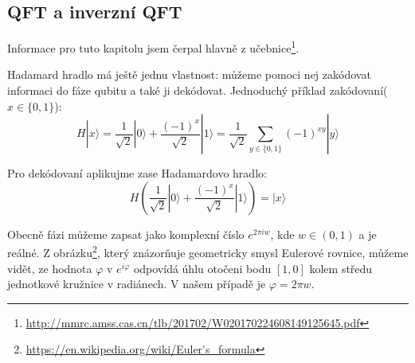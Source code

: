 \documentclass[11pt]{article}
\begin{document}
\subsection{QFT a inverzní QFT}
\label{sec:qft}
Informace pro tuto kapitolu jsem čerpal hlavně z učebnice\footnote{\url{http://mmrc.amss.cas.cn/tlb/201702/W020170224608149125645.pdf}}.
\par Hadamard hradlo má ještě jednu vlastnost: můžeme pomoci nej zakódovat informaci do fáze qubitu a také ji dekódovat.
Jednoduchý příklad zakódovaní($x\in\{0,1\}$):
$$H|x\rangle = \frac{1}{\sqrt{2}}|0\rangle + \frac{(-1)^x}{\sqrt{2}}|1\rangle = \frac{1}{\sqrt{2}}\displaystyle\sum_{y\in\{0, 1\}} (-1)^{xy}|y\rangle$$
\par Pro dekódovaní aplikujme zase Hadamardovo hradlo:
$$H\left(\frac{1}{\sqrt{2}}|0\rangle + \frac{(-1)^x}{\sqrt{2}}|1\rangle\right) = |x\rangle$$
\par Obecně fázi můžeme zapsat jako komplexní číslo $e^{2\pi i w}$, kde $w\in(0, 1)$ a je reálné.
Z obrázku\footnote{\url{https://en.wikipedia.org/wiki/Euler's_formula}}, který znázorňuje geometricky smysl Eulerové rovnice,
můžeme vidět, ze hodnota $\varphi$ v $e^{i\varphi}$ odpovídá úhlu otočeni bodu $[1, 0]$ kolem středu jednotkové kružnice v radiánech.
V našem případě je $\varphi = 2\pi w$.
\end{document}
